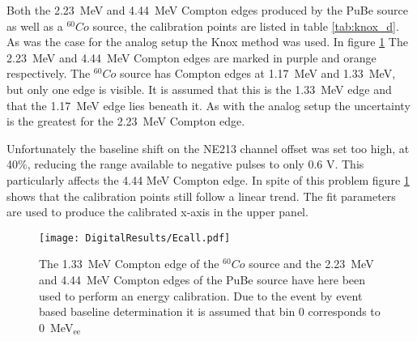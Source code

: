 \documentclass[main.tex]{subfiles}
\begin{document}
Both the \SI{2.23}{\MeV} and \SI{4.44}{\MeV} Compton edges produced by the PuBe source as well as a $^{60}Co$ source, the calibration points are listed in table \ref{tab:knox_d}. As was the case for the analog setup the Knox method was used. In figure \ref{fig:D_QDC} The \SI{2.23}{\MeV} and \SI{4.44}{\MeV} Compton edges are marked in purple and orange respectively. The $^{60}Co$ source has Compton edges at \SI{1.17}{\MeV} and \SI{1.33}{\MeV}, but only one edge is visible. It is assumed that this is the \SI{1.33}{\MeV} edge and that the \SI{1.17}{\MeV} edge lies beneath it. As with the analog setup the uncertainty is the greatest for the \SI{2.23}{\MeV} Compton edge.

Unfortunately the baseline shift on the NE213 channel offset was set too high, at 40\%, reducing the range available to negative pulses to only 0.6 V. This particularly affects the 4.44 \si{\MeV} Compton edge. In spite of this problem figure \ref{fig:D_QDC} shows that the calibration points still follow a linear trend. The fit parameters are used to produce the calibrated x-axis in the upper panel.

\begin{figure}[ht]
    \centering
        \texttt{[image: DigitalResults/Ecall.pdf]}
        \caption[Energy calibration of the digital setup]{The \SI{1.33}{\MeV} Compton edge of the $^{60}Co$ source and the \SI{2.23}{\MeV} and \SI{4.44}{\MeV} Compton edges of the PuBe source have here been used to perform an energy calibration. Due to the event by event based baseline determination it is assumed that bin 0 corresponds to \SI{0}{\MeV}$_\text{ee}$}
    \label{fig:D_QDC}
\end{figure}
\end{document}
